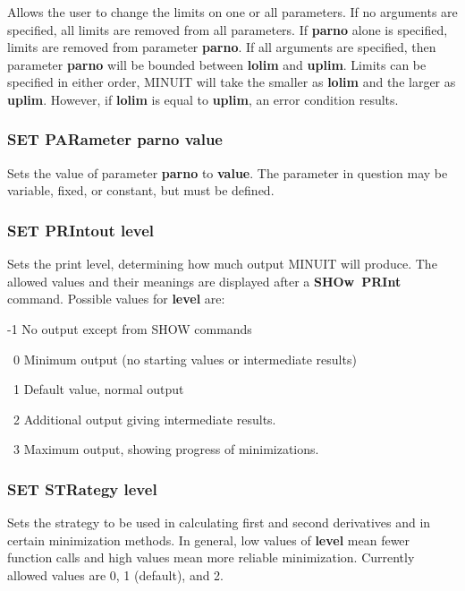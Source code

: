 Allows the user to change the limits on one or all parameters.
If no arguments are specified, all limits are removed from all parameters.
If {\bf \lsb parno\rsb } alone is specified,
limits are removed from parameter {\bf \lsb parno\rsb }.
If all arguments are specified, then parameter
{\bf \lsb parno\rsb } will be bounded
between {\bf \lsb lolim\rsb } and {\bf \lsb uplim\rsb }.
Limits can be specified in either order,
MINUIT will take the smaller as {\bf \lsb lolim\rsb }
and the larger as {\bf \lsb uplim\rsb }.
However, if {\bf \lsb lolim\rsb } is equal to
{\bf \lsb uplim\rsb }, an error condition results.

\subsubsection*{SET PARameter  parno  value}

Sets the value of parameter {\bf parno} to {\bf value}.
The parameter
in question may be variable, fixed, or constant, but must be defined.

\subsubsection*{SET PRIntout level}

Sets the print level, determining how much output
MINUIT will produce.
The allowed values and their meanings are displayed
after a {\bf SHOw~PRInt} command.
Possible values for {\bf level} are:
\begin{DLtt}{12}
\item[-1] No output except from SHOW commands
\item[\ 0]  Minimum output (no starting values or intermediate results)
\item[\ 1]  Default value, normal output
\item[\ 2]  Additional output giving intermediate results.
\item[\ 3]  Maximum output, showing progress of minimizations.
\end{DLtt}

\subsubsection*{SET STRategy level}

Sets the strategy to be used in calculating first and second derivatives
and in certain minimization methods. In general, low values of {\bf level}
mean fewer function calls and high values mean more reliable minimization.
Currently allowed values are 0, 1 (default), and 2.

